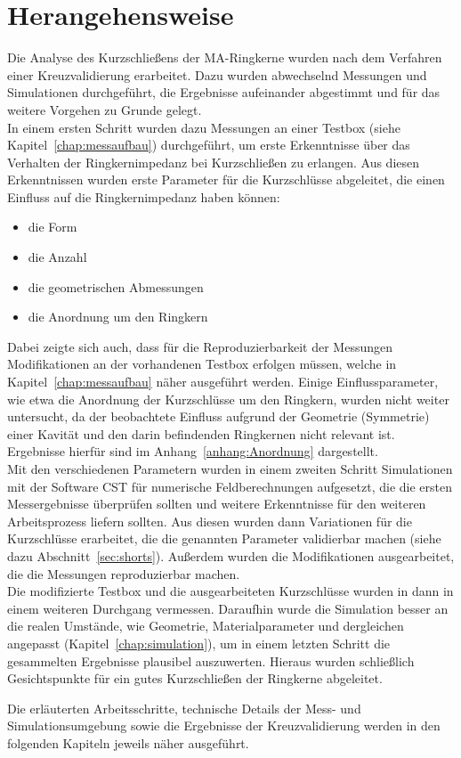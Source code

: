 \section{Herangehensweise}
Die Analyse des Kurzschließens der MA-Ringkerne wurden nach dem Verfahren einer Kreuzvalidierung erarbeitet. Dazu wurden abwechselnd Messungen und Simulationen durchgeführt, die Ergebnisse aufeinander abgestimmt und für das weitere Vorgehen zu Grunde gelegt.\\
In einem ersten Schritt wurden dazu Messungen an einer Testbox (siehe Kapitel~\ref{chap:messaufbau}) durchgeführt, um erste Erkenntnisse über das Verhalten der Ringkernimpedanz bei Kurzschließen zu erlangen. Aus diesen Erkenntnissen wurden erste Parameter für die Kurzschlüsse abgeleitet, die einen Einfluss auf die Ringkernimpedanz haben können:
    \begin{itemize}
        \item die Form
        \item die Anzahl
        \item die geometrischen Abmessungen
        \item die Anordnung um den Ringkern
    \end{itemize}
Dabei zeigte sich auch, dass für die Reproduzierbarkeit der Messungen Modifikationen an der vorhandenen Testbox erfolgen müssen, welche in Kapitel~\ref{chap:messaufbau} näher ausgeführt werden. Einige Einflussparameter, wie etwa die Anordnung der Kurzschlüsse um den Ringkern, wurden nicht weiter untersucht, da der beobachtete Einfluss aufgrund der Geometrie (Symmetrie) einer Kavität und den darin befindenden Ringkernen nicht relevant ist. Ergebnisse hierfür sind im Anhang~\ref{anhang:Anordnung} dargestellt.\\
Mit den verschiedenen Parametern wurden in einem zweiten Schritt Simulationen mit der Software CST für numerische Feldberechnungen aufgesetzt, die die ersten Messergebnisse überprüfen sollten und weitere Erkenntnisse für den weiteren Arbeitsprozess liefern sollten. Aus diesen wurden dann Variationen für die Kurzschlüsse erarbeitet, die die genannten Parameter validierbar machen (siehe dazu Abschnitt~\ref{sec:shorts}). Außerdem wurden die Modifikationen ausgearbeitet, die die Messungen reproduzierbar machen.\\
Die modifizierte Testbox und die ausgearbeiteten Kurzschlüsse wurden in dann in einem weiteren Durchgang vermessen. Daraufhin wurde die Simulation besser an die realen Umstände, wie Geometrie, Materialparameter und dergleichen angepasst (Kapitel~\ref{chap:simulation}), um in einem letzten Schritt die gesammelten Ergebnisse plausibel auszuwerten. Hieraus wurden schließlich Gesichtspunkte für ein gutes Kurzschließen der Ringkerne abgeleitet.
\par
Die erläuterten Arbeitsschritte, technische Details der Mess- und Simulationsumgebung sowie die Ergebnisse der Kreuzvalidierung werden in den folgenden Kapiteln jeweils näher ausgeführt.